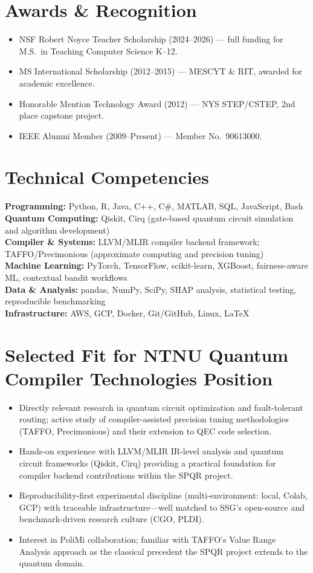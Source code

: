 \documentclass[11pt]{article}
\begin{document}
\section{Awards \& Recognition}
\begin{itemize}
  \item NSF Robert Noyce Teacher Scholarship (2024--2026) --- full funding for M.S.\ in Teaching Computer Science K--12.
  \item MS International Scholarship (2012--2015) --- MESCYT \& RIT, awarded for academic excellence.
  \item Honorable Mention Technology Award (2012) --- NYS STEP/CSTEP, 2nd place capstone project.
  \item IEEE Alumni Member (2009--Present) --- Member No.\ 90613000.
\end{itemize}

\section{Technical Competencies}
\textbf{Programming:} Python, R, Java, C++, C\#, MATLAB, SQL, JavaScript, Bash\\
\textbf{Quantum Computing:} Qiskit, Cirq (gate-based quantum circuit simulation and algorithm development)\\
\textbf{Compiler \& Systems:} LLVM/MLIR compiler backend framework; TAFFO/Precimonious (approximate computing and precision tuning)\\
\textbf{Machine Learning:} PyTorch, TensorFlow, scikit-learn, XGBoost, fairness-aware ML, contextual bandit workflows\\
\textbf{Data \& Analysis:} pandas, NumPy, SciPy, SHAP analysis, statistical testing, reproducible benchmarking\\
\textbf{Infrastructure:} AWS, GCP, Docker, Git/GitHub, Linux, LaTeX

\section{Selected Fit for NTNU Quantum Compiler Technologies Position}
\begin{itemize}
  \item Directly relevant research in quantum circuit optimization and fault-tolerant routing; active study of compiler-assisted precision tuning methodologies (TAFFO, Precimonious) and their extension to QEC code selection.
  \item Hands-on experience with LLVM/MLIR IR-level analysis and quantum circuit frameworks (Qiskit, Cirq) providing a practical foundation for compiler backend contributions within the SPQR project.
  \item Reproducibility-first experimental discipline (multi-environment: local, Colab, GCP) with traceable infrastructure---well matched to SSG's open-source and benchmark-driven research culture (CGO, PLDI).
  \item Interest in PoliMi collaboration; familiar with TAFFO's Value Range Analysis approach as the classical precedent the SPQR project extends to the quantum domain.
\end{itemize}
\end{document}
